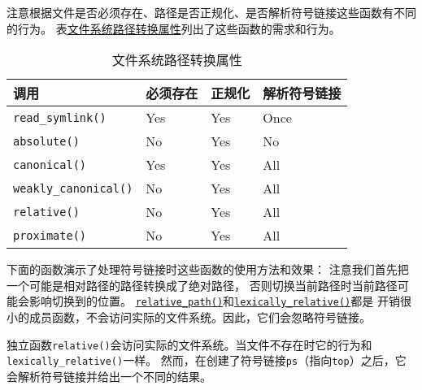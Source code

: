注意根据文件是否必须存在、路径是否正规化、是否解析符号链接这些函数有不同的行为。
表\hyperref[t20.19]{文件系统路径转换属性}列出了这些函数的需求和行为。
\begin{table}[htb]
    \centering
    \begin{tabular}{l|l|l|l}
        \hline
        \textbf{调用}                  & \textbf{必须存在} & \textbf{正规化} & \textbf{解析符号链接} \\
        \hline
        \texttt{read\_symlink()}     & Yes           & Yes          & Once            \\
        \texttt{absolute()}          & No            & Yes          & No              \\
        \texttt{canonical()}         & Yes           & Yes          & All             \\
        \texttt{weakly\_canonical()} & No            & Yes          & All             \\
        \texttt{relative()}          & No            & Yes          & All             \\
        \texttt{proximate()}         & No            & Yes          & All             \\
        \hline
    \end{tabular}
    \caption{文件系统路径转换属性}
    \label{t20.19}
\end{table}

下面的函数演示了处理符号链接时这些函数的使用方法和效果：
注意我们首先把一个可能是相对路径的路径转换成了绝对路径，
否则切换当前路径时当前路径可能会影响切换到的位置。
\hyperref[ch20.3.2]{\texttt{relative\_path()}}和\hyperref[ch20.3.3]{\texttt{lexically\_relative()}}都是
开销很小的成员函数，不会访问实际的文件系统。因此，它们会忽略符号链接。

独立函数\texttt{relative()}会访问实际的文件系统。当文件不存在时它的行为和\texttt{lexically\_relative()}一样。
然而，在创建了符号链接\texttt{ps}（指向\texttt{top}）之后，它会解析符号链接并给出一个不同的结果。

